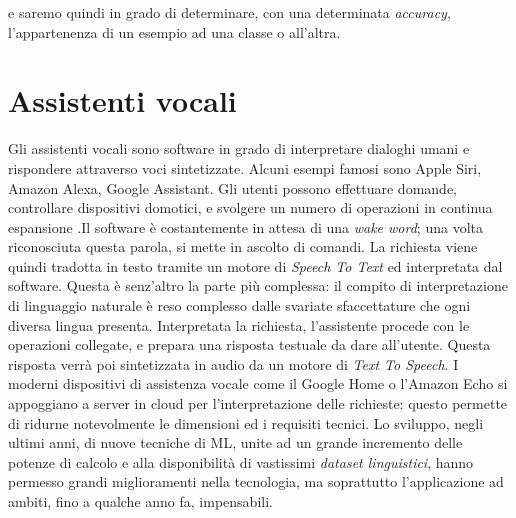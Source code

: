 e saremo quindi in grado di determinare, con una determinata \textit{accuracy}, l'appartenenza di un esempio ad una classe o all'altra.
\section{Assistenti vocali}
Gli assistenti vocali sono software in grado di interpretare dialoghi umani e rispondere attraverso voci sintetizzate. Alcuni esempi famosi sono Apple Siri, Amazon Alexa, Google Assistant. Gli utenti possono effettuare domande, controllare dispositivi domotici, e svolgere un numero di operazioni in continua espansione \cite{article:introduction_to_va}.Il software è costantemente in attesa di una \textit{wake word}; una volta riconosciuta questa parola, si mette in ascolto di comandi. La richiesta viene quindi tradotta in testo tramite un motore di \textit{Speech To Text} ed interpretata dal software. Questa è senz'altro la parte più complessa: il compito di interpretazione di linguaggio naturale è reso complesso dalle svariate sfaccettature che ogni diversa lingua presenta. Interpretata la richiesta, l'assistente procede con le operazioni collegate, e prepara una risposta testuale da dare all'utente. Questa risposta verrà poi sintetizzata in audio da un motore di \textit{Text To Speech}. I moderni dispositivi di assistenza vocale come il Google Home o l'Amazon Echo si appoggiano a server in cloud per l'interpretazione delle richieste: questo permette di ridurne notevolmente le dimensioni ed i requisiti tecnici.
Lo sviluppo, negli ultimi anni, di nuove tecniche di ML, unite ad un grande incremento delle potenze di calcolo e alla disponibilità di vastissimi \textit{dataset linguistici}, hanno permesso grandi miglioramenti nella tecnologia, ma soprattutto l'applicazione ad ambiti, fino a qualche anno fa, impensabili.
